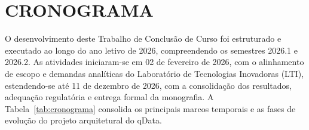 \chapter{CRONOGRAMA}

O desenvolvimento deste Trabalho de Conclusão de Curso foi estruturado e executado ao longo do ano letivo de 2026, compreendendo os semestres 2026.1 e 2026.2. As atividades iniciaram-se em 02 de fevereiro de 2026, com o alinhamento de escopo e demandas analíticas do Laboratório de Tecnologias Inovadoras (LTI), estendendo-se até 11 de dezembro de 2026, com a consolidação dos resultados, adequação regulatória e entrega formal da monografia. A Tabela~\ref{tab:cronograma} consolida os principais marcos temporais e as fases de evolução do projeto arquitetural do qData.

